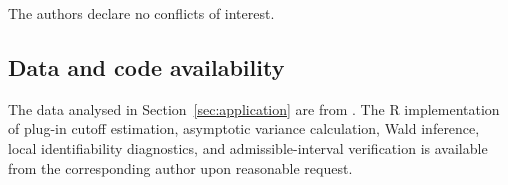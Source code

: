 \documentclass[11pt,a4paper]{article}
\theoremstyle{definition}
\theoremstyle{remark}
\newcommand{\1}{\mathbf{1}}
\begin{document}
The authors declare no conflicts of interest.

\subsection*{Data and code availability}

The data analysed in Section~\ref{sec:application} are from
\citet{rosado2020multiplex}. The \textsf{R} implementation of plug-in
cutoff estimation, asymptotic variance calculation, Wald inference,
local identifiability diagnostics, and admissible-interval verification
is available from the corresponding author upon reasonable request.



\end{document}
